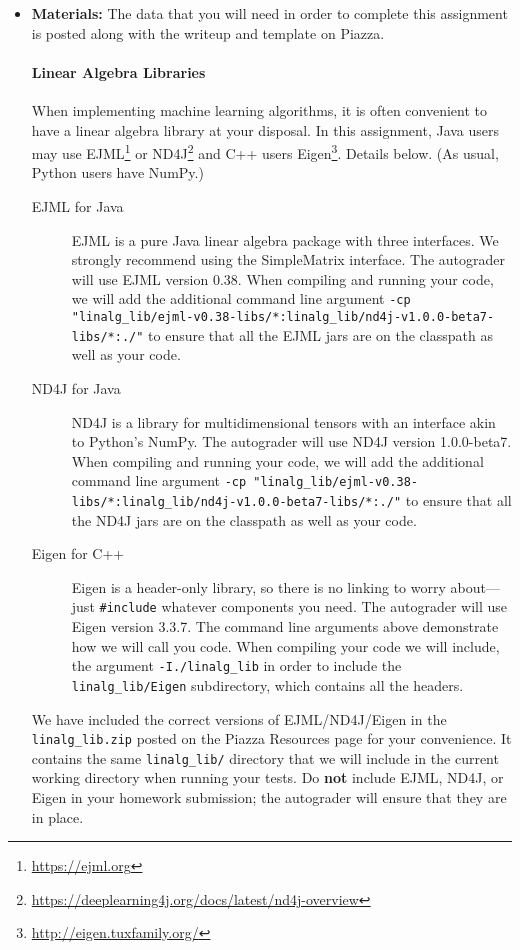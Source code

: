 \documentclass[11pt,addpoints,answers]{exam}
\begin{document}
\begin{itemize}
\begin{itemize}
  \end{itemize}

\item \textbf{Materials:} The data that you will need in order to complete this assignment is posted along with the writeup and template on Piazza.

\begin{notebox}
\paragraph{Linear Algebra Libraries} When implementing machine learning algorithms, it is often convenient to have a linear algebra library at your disposal. In this assignment, Java users may use EJML\footnote{\url{https://ejml.org}} or ND4J\footnote{\url{https://deeplearning4j.org/docs/latest/nd4j-overview}} and C++ users Eigen\footnote{\url{http://eigen.tuxfamily.org/}}. Details below. 
%
(As usual, Python users have NumPy.)
%
\begin{description}
\item[EJML for Java] EJML is a pure Java linear algebra package with three interfaces. We strongly recommend using the SimpleMatrix interface. The autograder will use EJML version 0.38. When compiling and running your code, we will add the additional command line argument \small{\lstinline{-cp "linalg_lib/ejml-v0.38-libs/*:linalg_lib/nd4j-v1.0.0-beta7-libs/*:./"}}
to ensure that all the EJML jars are on the classpath as well as your code. 

\item[ND4J for Java] ND4J is a library for multidimensional tensors with an interface akin to Python's NumPy. The autograder will use ND4J version 1.0.0-beta7. When compiling and running your code, we will add the additional command line argument \small{\lstinline{-cp "linalg_lib/ejml-v0.38-libs/*:linalg_lib/nd4j-v1.0.0-beta7-libs/*:./"}} to ensure that all the ND4J jars are on the classpath as well as your code. 

\item[Eigen for C++] Eigen is a header-only library, so there is no linking to worry about---just \lstinline{#include} whatever components you need. The autograder will use Eigen version 3.3.7. The command line arguments above demonstrate how we will call you code. When compiling your code we will include, the argument \lstinline{-I./linalg_lib} in order to include the \lstinline{linalg_lib/Eigen} subdirectory, which contains all the headers.

\end{description} 
We have included the correct versions of EJML/ND4J/Eigen in the \lstinline{linalg_lib.zip} posted on the Piazza Resources page for your convenience. It contains the same \lstinline{linalg_lib/} directory that we will include in the current working directory when running your tests. Do {\bf not} include EJML, ND4J, or Eigen in your homework submission; the autograder will ensure that they are in place. 
\end{notebox}

\end{itemize}
\clearpage
\end{document}

